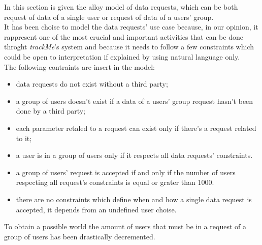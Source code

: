 In this section is given the alloy model of data requests, which can be both request of data of a single user or request of data of a users' group.\\
It has been choise to model the data requests' use case because, in our opinion, it rappresent one of the most crucial and important activities that can be done throght \textit{trackMe}'s system and because it needs to follow a few constraints which could be open to interpretation if explained by using natural language only.\\
The following contraints are insert in the model:\\
\begin{itemize}
	\item data requests do not exist without a third party;
	\item a group of users doesn't exist if a data of a users' group request hasn't been done by a third party;
	\item each parameter retaled to a request can exist only if there's a request related to it;
	\item a user is in a group of users only if it respects all data requests' constraints.
	\item a group of users' request is accepted if and only if the number of users respecting all request's constraints is equal or grater 		than 1000.
	\item there are no constraints which define when and how a single data request is accepted, it depends from an undefined user 		choise.
\end{itemize}To obtain a possible world the amount of users that must be in a request of a group of users has been drastically decremented.
